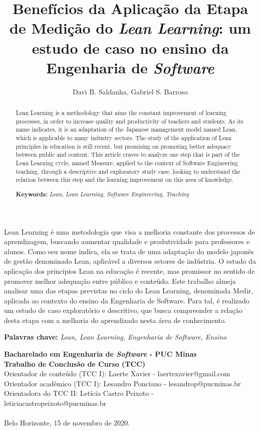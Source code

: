 \documentclass[12pt]{article}
\title{Benefícios da Aplicação da Etapa de Medição do \textit{Lean Learning}: um estudo de
caso no ensino da Engenharia de \textit{Software}}
\author{Davi B. Saldanha\inst{1}, Gabriel S. Barroso\inst{1}}
\begin{document}
 

\maketitle

\begin{abstract}
  Lean Learning is a methodology that aims the constant improvement of learning processes, in order to increase quality and productivity of teachers and students. As its name indicates, it is an adaptation of the Japanese management model named Lean, which is applicable to many industry sectors. The study of the application of Lean principles in education is still recent, but promising on promoting better adequacy between public and content. This article craves to analyze one step that is part of the Lean Learning cycle, named Measure, applied to the context of Software Engineering teaching, through a descriptive and exploratory study case, looking to understand the relation between this step and the learning improvement on this area of knowledge.
  
  \textbf{Keywords:} \emph{Lean, Lean Learning, Software Engineering, Teaching}
\end{abstract}
     
\begin{resumo} 
  Lean Learning é uma metodologia que visa a melhoria constante dos processos de aprendizagem, buscando aumentar qualidade e produtividade para professores e alunos. Como seu nome indica, ela se trata de uma adaptação do modelo japonês de gestão denominado Lean, aplicável a diversos setores de indústria. O estudo da aplicação dos princípios Lean na educação é recente, mas promissor no sentido de promover melhor adequação entre público e conteúdo. Este trabalho almeja analisar uma das etapas previstas no ciclo do Lean Learning, denominada Medir, aplicada ao contexto do ensino da Engenharia de Software. Para tal, é realizado um estudo de caso exploratório e descritivo, que busca compreender a relação desta etapa com a melhoria do aprendizado nesta área de conhecimento.
  
  \textbf{Palavras chave:} \emph{\textit{Lean}, \textit{Lean Learning}, Engenharia de \textit{Software}, Ensino}
\end{resumo}

\begin{tcolorbox}
\footnotesize
\textbf{Bacharelado em Engenharia de \emph{Software} - PUC Minas\\
Trabalho de Conclusão de Curso (TCC)} \\

\indent Orientador de conteúdo (TCC I): Laerte Xavier - laertexavier@gmail.com\\
Orientador acadêmico (TCC I): Lesandro Ponciano - lesandrop@pucminas.br\\
Orientadora do TCC II: Letícia Castro Peixoto - leticiacastropeixoto@pucminas.br\\ \\
Belo Horizonte, 15 de novembro de 2020.
\end{tcolorbox}
\end{document}
